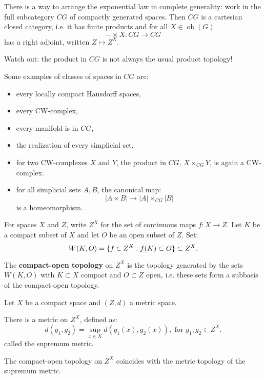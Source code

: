 \begin{remark}
There is a way to arrange the exponential law in complete generality: work in the full subcategory $CG$ of compactly generated spaces. Then $CG$ is a cartesian closed category, i.e. it has finite products and for all $X\in\operatorname{ob}(G)$
\[-\times X:CG\to CG\]
has a right adjoint, written $Z\mapsto Z^X$.

Watch out: the product in $CG$ is not always the usual product topology!

Some examples of classes of spaces in $CG$ are:
\begin{itemize}[label={-}]
    \item every locally compact Hausdorff spaces,
    \item every CW-complex,
    \item every manifold is in $CG$,
    \item the realization of every simplicial set,
    \item for two CW-complexes $X$ and $Y$, the product in $CG$, $X\times_{CG}Y$, is again a CW-complex.
    \item for all simplicial sets $A,B$, the canonical map:
    \[|A\times B|\to|A|\times_{CG}|B|\]
    is a homeomorphism.
\end{itemize}
\end{remark}


For spaces $X$ and $Z$, write $Z^X$ for the set of continuous maps $f:X\to Z$. Let $K$ be a compact subset of $X$ and let $O$ be an open subset of $Z$. Set:
\[W(K,O)=\{f\in Z^X:f(K)\subset O\}\subset Z^X.\]

The \textbf{compact-open topology} on $Z^X$ is the topology generated by the sets $W(K,O)$ with $K\subset X$ compact and $O\subset Z$ open, i.e. these sets form a subbasis of the compact-open topology.

\begin{theorem}
Let $X$ be a compact space and $(Z,d)$ a metric space.
\begin{numerate}
\item There is a metric on $Z^X$, defined as:
\[d(g_1,g_2)=\sup_{x\in X}d(g_1(x),g_2(x)),\text{ for }g_1,g_2\in Z^X.\]
called the supremum metric.
\item The compact-open topology on $Z^X$ coincides with the metric topology of the supremum metric.
\end{numerate}
\end{theorem}

